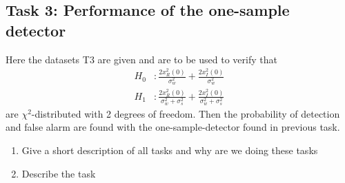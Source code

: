 \subsection{Task 3: Performance of the one-sample detector}
Here the datasets T3 are given and are to be used to verify that
\begin{align}
	H_0 &: \frac{2x_R^2(0)}{\sigma_w^2}+\frac{2x_I^2(0)}{\sigma_w^2}\nonumber\\
	H_1 &: \frac{2x_R^2(0)}{\sigma_w^2+\sigma_s^2}+\frac{2x_I^2(0)}{\sigma_w^2+\sigma_s^2}\nonumber
\end{align}
are $\chi^2$-distributed with 2 degrees of freedom.  Then the probability of detection and false alarm are found with the one-sample-detector found in previous task.

\begin{enumerate}[i]
	\item Give a short description of all tasks and why are we doing these tasks
	\item Describe the task
\end{enumerate}
